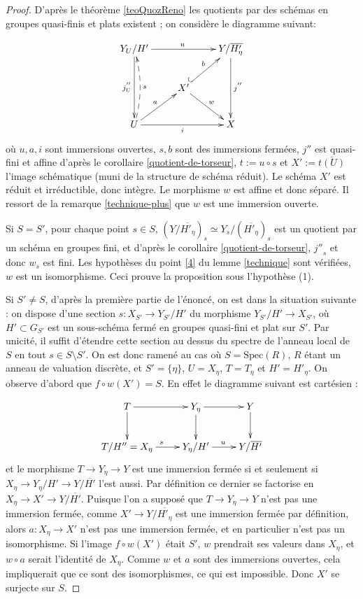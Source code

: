\documentclass[11pt]{amsart}
\numberwithin{equation}{section}
\theoremstyle{definition}
\theoremstyle{remark}
\begin{document}
\begin{proof}

D'apr\`es le th\'eor\`eme \ref{teoQuozReno} les quotients par des sch\'emas en groupes quasi-finis et plats existent ; on consid\`ere
le diagramme suivant:

 \begin{equation}\label{eqFIG1}
\xymatrix{Y_U/H'\ar[dd]_{j^{''}_U}\ar[rr]^u & & Y/\overline{H'_\eta }\ar[dd]^{j^{''}} \\
 & X'\ar[rd]^w\ar@{^{(}->}[ru]^b & \\
 U\ar@/_/@{-->}[uu]_s \ar[ru]^a \ar[rr]_i & & X }
  \end{equation}
 o\`u $u,a,i$ sont immersions ouvertes, $s,b$ sont des immersions ferm\'ees, $j''$ est quasi-fini et affine d'apr\`es le corollaire \ref{quotient-de-torseur}, $t:=u\circ s$ et $X':= \overline{t(U)}$ l'image sch\'ematique (muni de la structure de sch\'ema r\'eduit). Le sch\'ema $X'$ est r\'eduit et irr\'eductible, donc int\`egre. Le morphisme $w$ est affine et donc s\'epar\'e. Il ressort de la remarque \ref{technique-plus} que $w$ est une immersion ouverte.

Si $S=S'$, pour chaque point $s \in S$, $(Y/\overline{H'_\eta })_s\simeq Y_s/(\overline{H'_\eta })_s$ est un quotient par un sch\'ema en groupes fini, et d'apr\`es le corollaire \ref{quotient-de-torseur}, ${j''}_s$ et donc $w_s$ est fini. Les hypoth\`eses du point \ref{4} du lemme \ref{technique} sont v\'erifi\'ees, $w$ est un isomorphisme. Ceci prouve la proposition sous l'hypoth\`ese (1).


Si $S' \not=S$, d'apr\`es la premi\`ere partie de l'\'enonc\'e, on est dans la situation suivante : on dispose d'une section $s : X_{S'} \to Y_{S'} /H' $ du morphisme $Y_{S'} /H'  \to X_{S'}$, o\`u $H' \subset G_{S'}$ est un sous-sch\'ema ferm\'e en groupes quasi-fini et plat sur $S'$. Par unicit\'e, il suffit d'\'etendre cette section au dessus du spectre de l'anneau local de $S$ en tout $s \in S\setminus S'$. On est donc ramen\'e au cas o\`u $S = \mathrm{Spec} (R)$, $R$ \'etant un anneau de valuation discr\`ete, et $S' =\{ \eta  \} $, $U=X_{\eta}$, $T=T_{\eta}$ et $H'=H'_{\eta}$. On observe d'abord que $f\circ w(X')=S$. En effet le diagramme suivant est cart\'esien :

 $$\xymatrix{
 T \ar[r] \ar[d] &Y_{\eta} \ar[d] \ar[r] &Y \ar[d]\\
 T /H'' = X_\eta \ar[r]^s & Y_\eta /H' \ar[r]^u &Y/\overline {H'}  \\
 }$$
et le morphisme $T \to Y_{\eta}\to  Y$ est une immersion ferm\'ee si et seulement si $X_{\eta} \to Y_\eta /H' \to  Y/ \overline{H'}$ l'est aussi. Par d\'efinition ce dernier se factorise en   $X_{\eta} \to X' \to  Y/ \overline{H'}$. Puisque l'on a suppos\'e que $T \to Y_{\eta}\to  Y$ n'est pas une immersion ferm\'ee, comme $X' \to  Y/ \overline{H'_{\eta}}$ est une immersion ferm\'ee par d\'efinition, alors $a:X_{\eta} \to X'$ n'est pas une immersion ferm\'ee, et en particulier n'est pas un isomorphisme. Si l'image $f\circ w (X')$ \'etait $S'$, $w$ prendrait ses valeurs dans $X_\eta$, et $w\circ a$ serait l'identit\'e de $X_\eta$. Comme $w$ et $a$ sont des immersions ouvertes, cela impliquerait que ce sont des isomorphismes, ce qui est impossible. Donc $X'$ se surjecte sur $S$.


\end{proof}
\end{document}
